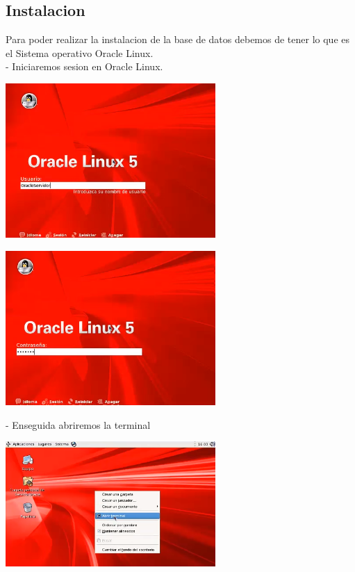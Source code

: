 \documentclass[12pt,letterpaper]{article}
\begin{document}
\subsection{Instalacion}
Para poder realizar la instalacion de la base de datos  debemos de tener lo que es el Sistema operativo Oracle Linux. \\
- Iniciaremos sesion en Oracle Linux. \\
\begin{center}
\includegraphics[width=8cm]{IMG/oracle1.png} 
\end{center}

\begin{center}
\includegraphics[width=8cm]{IMG/oracle2.png} 
\end{center}
- Enseguida abriremos la terminal \\

\begin{center}
\includegraphics[width=8cm]{IMG/oracle3.png} 
\end{center}
\end{document}
